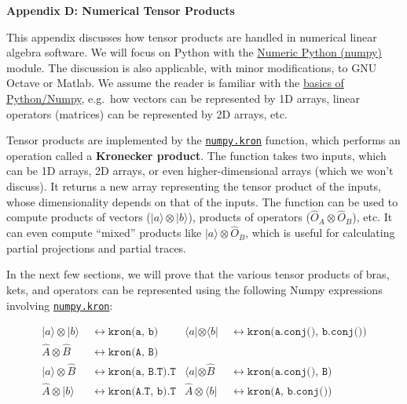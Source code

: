 \documentclass[prx,12pt]{revtex4-2}
\begin{document}
\begin{center}
{\large \textbf{Appendix D: Numerical Tensor Products}}
\end{center}

\noindent
This appendix discusses how tensor products are handled in numerical
linear algebra software.  We will focus on Python with the
\href{https://numpy.org/}{Numeric Python (numpy)} module.  The
discussion is also applicable, with minor modifications, to GNU Octave
or Matlab.  We assume the reader is familiar with the
\href{https://docs.scipy.org/doc/numpy/user/quickstart.html}{basics of
  Python/Numpy}, e.g.~how vectors can be represented by 1D arrays,
linear operators (matrices) can be represented by 2D arrays, etc.

Tensor products are implemented by the
\href{https://docs.scipy.org/doc/numpy/reference/generated/numpy.kron.html}{\texttt{numpy.kron}}
function, which performs an operation called a \textbf{Kronecker
  product}.  The function takes two inputs, which can be 1D arrays, 2D
arrays, or even higher-dimensional arrays (which we won't discuss).
It returns a new array representing the tensor product of the inputs,
whose dimensionality depends on that of the inputs.  The function can
be used to compute products of vectors ($|a\rangle\otimes|b\rangle$),
products of operators ($\hat{O}_A\otimes \hat{O}_B$), etc.  It can
even compute ``mixed'' products like $|a\rangle\otimes\hat{O}_B$,
which is useful for calculating partial projections and partial
traces.

In the next few sections, we will prove that the various tensor
products of bras, kets, and operators can be represented using the
following Numpy expressions involving
\href{https://docs.scipy.org/doc/numpy/reference/generated/numpy.kron.html}{\texttt{numpy.kron}}:
\begin{framed}
  \begin{align*}
    |a\rangle\otimes|b\rangle &\;\;\leftrightarrow\;
    \texttt{kron(a, b)} &
    \langle a | \otimes \langle b| &\;\;\leftrightarrow\;
    \texttt{kron(a.conj(), b.conj())} \\
    \hat{A}\otimes\hat{B} &\;\;\leftrightarrow\;
    \texttt{kron(A, B)} \\
    |a\rangle \otimes \hat{B} &\;\;\leftrightarrow\;
    \texttt{kron(a, B.T).T} &
    \langle a| \otimes \hat{B} &\;\;\leftrightarrow\;
    \texttt{kron(a.conj(), B)} \\
    \hat{A} \otimes | b\rangle &\;\;\leftrightarrow\;
    \texttt{kron(A.T, b).T} &
    \hat{A} \otimes \langle b| &\;\;\leftrightarrow\;
    \texttt{kron(A, b.conj())}
  \end{align*}
\end{framed}
\end{document}
